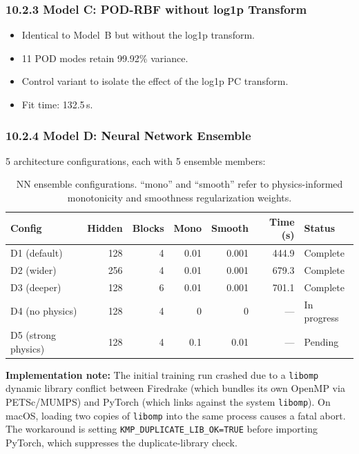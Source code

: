 \documentclass[11pt]{article}
\begin{document}
\subsubsection*{10.2.3 Model C: POD-RBF without log1p Transform}

\begin{itemize}
  \item Identical to Model~B but without the log1p transform.
  \item 11 POD modes retain 99.92\% variance.
  \item Control variant to isolate the effect of the log1p PC transform.
  \item Fit time: 132.5\,s.
\end{itemize}

\subsubsection*{10.2.4 Model D: Neural Network Ensemble}

5 architecture configurations, each with 5 ensemble members:

\begin{table}[H]
  \centering
  \caption{NN ensemble configurations.  ``mono'' and ``smooth'' refer to
           physics-informed monotonicity and smoothness regularization weights.}
  \label{tab:nn_configs}
  \begin{tabular}{l r r r r r l}
    \toprule
    Config & Hidden & Blocks & Mono & Smooth & Time (s) & Status \\
    \midrule
    D1 (default)        & 128 & 4 & 0.01  & 0.001 &  444.9 & Complete \\
    D2 (wider)          & 256 & 4 & 0.01  & 0.001 &  679.3 & Complete \\
    D3 (deeper)         & 128 & 6 & 0.01  & 0.001 &  701.1 & Complete \\
    D4 (no physics)     & 128 & 4 & 0     & 0     &  {---} & In progress \\
    D5 (strong physics) & 128 & 4 & 0.1   & 0.01  &  {---} & Pending \\
    \bottomrule
  \end{tabular}
\end{table}

\textbf{Implementation note:} The initial training run crashed due to a
\texttt{libomp} dynamic library conflict between Firedrake (which bundles
its own OpenMP via PETSc/MUMPS) and PyTorch (which links against the
system \texttt{libomp}).  On macOS, loading two copies of \texttt{libomp}
into the same process causes a fatal abort.  The workaround is setting
\texttt{KMP\_DUPLICATE\_LIB\_OK=TRUE} before importing PyTorch, which
suppresses the duplicate-library check.
\end{document}
